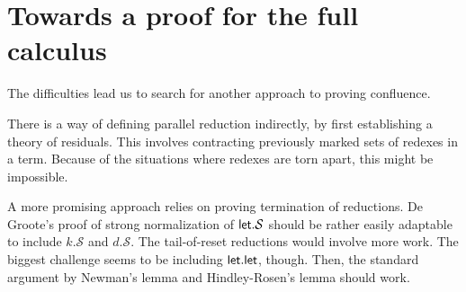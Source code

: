 \documentclass[a4paper, 11pt,titlepage, openright, twoside]{report}
\newcommand{\keyword}[1]{\textsf{\textup{#1}}}
\newcommand{\KwLet}{\keyword{let}}
\renewcommand{\S}{\mathcal{S}}
\newcommand{\+}{\enspace}
\begin{document}
\section{Towards a proof for the full calculus}
The difficulties lead us to search for another approach to proving confluence.

There is a way of defining
parallel reduction indirectly, by first establishing a theory of residuals.
This involves contracting previously marked sets of redexes in a term.
Because of the situations where redexes are torn apart, this might be impossible.

A more promising approach relies on proving termination of reductions.
De Groote's proof of strong normalization of $\KwLet{}.\S$ \cite{Groote}
should be rather easily adaptable to include $k.\S$ and $d.\S$.
The tail-of-reset reductions would involve more work.
The biggest challenge seems to be including $\KwLet{}.\KwLet{}$, though.
Then, the standard argument by Newman's lemma and Hindley-Rosen's lemma should work.
\end{document}
